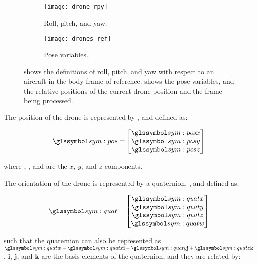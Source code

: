     \begin{figure}[h]
      \centering
      \begin{subfigure}[b]{0.45\textwidth}
	\texttt{[image: drone\_rpy]}
	\caption{Roll, pitch, and yaw.}
	\label{fig:drone_rpy}
      \end{subfigure}
      \hfill
      \begin{subfigure}[b]{0.45\textwidth}
	\texttt{[image: drones\_ref]}
	\caption{Pose variables.}
	\label{fig:drones_ref}
      \end{subfigure}
      \caption[Pose parameter definitions]{ shows the definitions of roll, pitch, and yaw with respect to an aircraft in the body frame of reference.  shows the pose variables, and the relative positions of the current drone position and the frame being processed.}
    \end{figure}

    The position of the drone is represented by , and defined as:

    \begin{equation}
      \sym{pos} = \begin{bmatrix}
	\sym{posx} \\
	\sym{posy} \\
	\sym{posz} \\
      \end{bmatrix}
    \end{equation}

    where , , and  are the $x$, $y$, and $z$ components.

    The orientation of the drone is represented by a quaternion, , and defined as:

    \begin{equation}
      \sym{quat} = \begin{bmatrix}
	\sym{quatx} \\
	\sym{quaty} \\
	\sym{quatz} \\
	\sym{quatw} \\
      \end{bmatrix}
    \end{equation}

    such that the quaternion can also be represented as $\sym{quatw} + \sym{quatx}\mathbf{i} + \sym{quaty}\mathbf{j} + \sym{quatz}\mathbf{k}$.
    $\mathbf{i}$, $\mathbf{j}$, and $\mathbf{k}$ are the basis elements of the quaternion, and they are related by:

